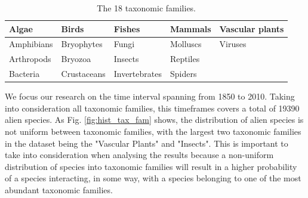 \documentclass[mscthesis]{usiinfthesis}
\begin{document}
\begin{table}[H]
\centering
\begin{tabular}{|l|l|l|l|l|}
\hline
Algae      & Birds       & Fishes        & Mammals  & Vascular plants \\ \hline
Amphibians & Bryophytes  & Fungi         & Molluscs & Viruses         \\ \hline
Arthropods & Bryozoa     & Insects       & Reptiles &                 \\ \hline
Bacteria   & Crustaceans & Invertebrates & Spiders  &                 \\ \hline             
\end{tabular}
\caption{The 18 taxonomic families.}
\label{table:families}
\end{table}

\noindent We focus our research on the time interval spanning from 1850 to 2010. Taking into consideration all taxonomic families, this timeframes covers a total of 19390 alien species. As Fig. \ref{fig:hist_tax_fam} shows, the distribution of alien species is not uniform between taxonomic families, with the largest two taxonomic families in the dataset being the "Vascular Plants" and "Insects". This is important to take into consideration when analysing the results because a non-uniform distribution of species into taxonomic families will result in a higher probability of a species interacting, in some way, with a species belonging to one of the most abundant taxonomic families.
\end{document}
